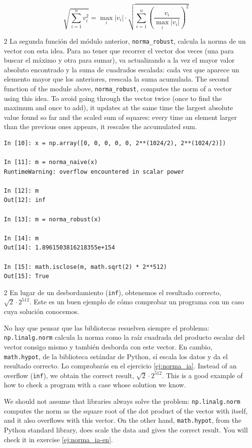 \begin{equation*}
\sqrt{\sum_{i=1}^nv_i^2}=\max_i\vert v_i\vert\cdot\sqrt{\sum_{i=1}^n\left(\frac{v_i}{\max_i\vert v_i\vert}\right)^2}
\end{equation*}
\begin{paracol}{2}
La segunda función del módulo anterior, \texttt{norma\_robust}, calcula la norma de un vector con esta idea. Para no tener que recorrer el vector dos veces (una para buscar el máximo y otra para sumar), va actualizando a la vez el mayor valor absoluto encontrado y la suma de cuadrados escalada: cada vez que aparece un elemento mayor que los anteriores, reescala la suma acumulada.
\switchcolumn
The second function of the module above, \texttt{norma\_robust}, computes the norm of a vector using this idea. To avoid going through the vector twice (once to find the maximum and once to add), it updates at the same time the largest absolute value found so far and the scaled sum of squares: every time an element larger than the previous ones appears, it rescales the accumulated sum.
\end{paracol}
\begin{verbatim}
In [10]: x = np.array([0, 0, 0, 0, 0, 2**(1024/2), 2**(1024/2)])

In [11]: m = norma_naive(x)
RuntimeWarning: overflow encountered in scalar power

In [12]: m
Out[12]: inf

In [13]: m = norma_robust(x)

In [14]: m
Out[14]: 1.8961503816218355e+154

In [15]: math.isclose(m, math.sqrt(2) * 2**512)
Out[15]: True
\end{verbatim}
\begin{paracol}{2}
En lugar de un desbordamiento (\texttt{inf}), obtenemos el resultado correcto, $\sqrt{2}\cdot 2^{512}$. Este es un buen ejemplo de cómo comprobar un programa con un caso cuya solución conocemos.

No hay que pensar que las bibliotecas resuelven siempre el problema: \texttt{np.linalg.norm} calcula la norma como la raíz cuadrada del producto escalar del vector consigo mismo y también desborda con este vector. En cambio, \texttt{math.hypot}, de la biblioteca estándar de Python, sí escala los datos y da el resultado correcto. Lo comprobarás en el ejercicio \ref{ej:norma_ia}.
\switchcolumn
Instead of an overflow (\texttt{inf}), we obtain the correct result, $\sqrt{2}\cdot 2^{512}$. This is a good example of how to check a program with a case whose solution we know.

We should not assume that libraries always solve the problem: \texttt{np.linalg.norm} computes the norm as the square root of the dot product of the vector with itself, and it also overflows with this vector. On the other hand, \texttt{math.hypot}, from the Python standard library, does scale the data and gives the correct result. You will check it in exercise \ref{ej:norma_ia-en}.
\end{paracol}

